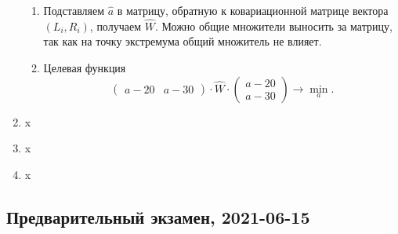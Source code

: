 \begin{enumerate}
\begin{enumerate}
        \item Подставляем $\hat a$ в матрицу, обратную к ковариационной матрице вектора $(L_i, R_i)$, получаем $\hat W$.
        Можно общие множители выносить за матрицу, так как на точку экстремума общий множитель не влияет.
        \item Целевая функция
        \[
        \begin{pmatrix} a - 20 & a - 30 \end{pmatrix} \cdot \hat W \cdot \begin{pmatrix} a - 20 \\ a - 30 \end{pmatrix} \to \min_a.
        \]
    \end{enumerate}
    \item x
    \item x
    \item x
\end{enumerate}



\subsection{Предварительный экзамен, 2021-06-15}


